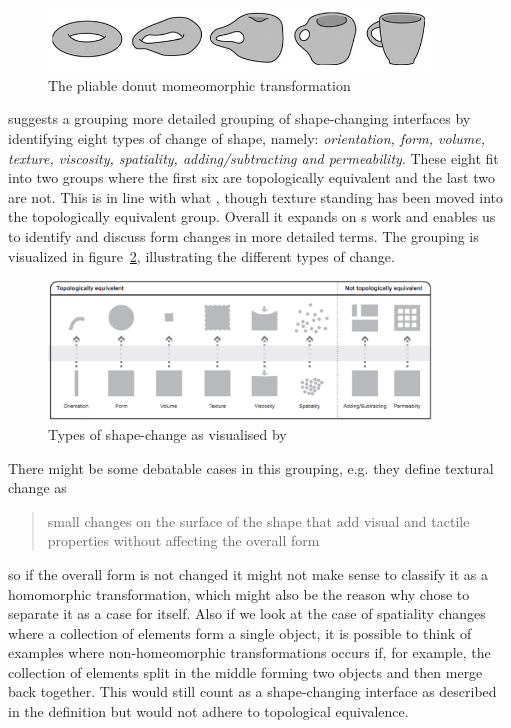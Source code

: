 \begin{figure}[hb]
	\centering
  		\includegraphics[width=4in]{figures/pliable-donut}
	\caption[The pliable donut momeomorphic transformation \cite{coelho2011shape}]
   {The pliable donut momeomorphic transformation \cite{coelho2011shape}}
   \label{pliable-mug}
\end{figure}   
 
\cite{rasmussen2012shape} suggests a grouping more detailed grouping of shape-changing interfaces by identifying eight types of change of shape, namely: \textit{orientation, form, volume, texture, viscosity, spatiality, adding/subtracting and permeability}.
These eight fit into two groups where the first six are topologically equivalent and the last two are not. This is in line with what \cite{coelho2011shape}, though texture standing has been moved into the topologically equivalent group. Overall it expands on \cite{coelho2011shape}s work and enables us to identify and discuss form changes in more detailed terms.
The grouping is visualized in figure~\ref{types-of-change}, illustrating the different types of change.

\begin{figure}[hb]
	\centering
  		\includegraphics[width=4in]{figures/types-of-change}
	\caption[Types of shape-change as visualised by \cite{rasmussen2012shape}]
   {Types of shape-change as visualised by \cite{rasmussen2012shape}}
   \label{types-of-change}
\end{figure}

There might be some debatable cases in this grouping, e.g. they define textural change as
\begin{quotation}
small changes on the surface of the shape that add visual and tactile properties without affecting the overall form
\end{quotation} 
so if the overall form is not changed it might not make sense to classify it as a homomorphic transformation, which might also be the reason why \cite{coelho2011shape} chose to separate it as a case for itself.
Also if we look at the case of spatiality changes where a collection of elements form a single object, it is possible to think of examples where non-homeomorphic transformations occurs if, for example, the collection of elements split in the middle forming two objects and then merge back together.
This would still count as a shape-changing interface as described in the definition but would not adhere to topological equivalence.   

